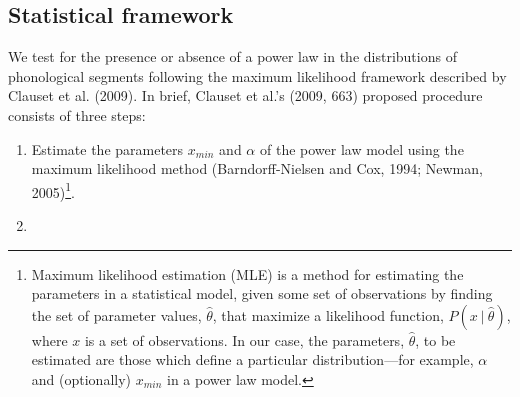 \hypertarget{method}{%
\subsection*{Statistical framework}\label{method}}

We test for the presence or absence of a power law in the distributions of phonological segments following the maximum likelihood framework described by Clauset et al. (2009). In brief, Clauset et al.'s (2009, 663) proposed procedure consists of three steps:

\begin{enumerate}
\def\labelenumi{\arabic{enumi}.}
\item
  Estimate the parameters \(x_{min}\) and \(\alpha\) of the power law model using the maximum likelihood method (Barndorff-Nielsen and Cox, 1994; Newman, 2005)\footnote{Maximum likelihood estimation (MLE) is a method for estimating the parameters in a statistical model, given some set of observations by finding the set of parameter values, \(\hat{\theta}\), that maximize a likelihood function, \(P(x\ |\ \hat{\theta})\), where \(x\) is a set of observations. In our case, the parameters, \(\hat{\theta}\), to be estimated are those which define a particular distribution---for example, \(\alpha\) and (optionally) \(x_{min}\) in a power law model.}.
\item

\end{enumerate}
